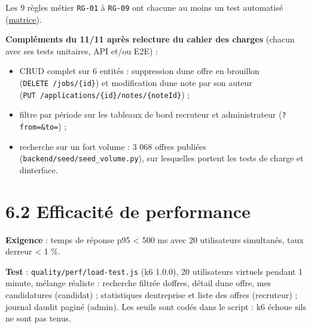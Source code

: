 \documentclass[
  11pt,
]{article}
\providecommand{\tightlist}{%
  \setlength{\itemsep}{0pt}\setlength{\parskip}{0pt}}
\begin{document}
Les 9 règles métier \texttt{RG‑01} à \texttt{RG‑09} ont chacune au moins
un test automatisé (\href{MATRICE_TRACABILITE.pdf}{matrice}).

\textbf{Compléments du 11/11 après relecture du cahier des charges}
(chacun avec ses tests unitaires, API et/ou E2E) :

\begin{itemize}
\tightlist
\item
  CRUD complet sur 6 entités : suppression d\textquotesingle une offre
  en brouillon (\texttt{DELETE\ /jobs/\{id\}}) et modification
  d\textquotesingle une note par son auteur
  (\texttt{PUT\ /}\allowbreak{}\texttt{applications/}\allowbreak{}\texttt{\{id\}/}\allowbreak{}\texttt{notes/}\allowbreak{}\texttt{\{note}\allowbreak{}\texttt{Id\}})
  ;
\item
  filtre par période sur les tableaux de bord recruteur et
  administrateur (\texttt{?from=\&to=}) ;
\item
  recherche sur un fort volume : 3 068 offres publiées
  (\texttt{backend/}\allowbreak{}\texttt{seed/}\allowbreak{}\texttt{seed\_}\allowbreak{}\texttt{volume.}\allowbreak{}\texttt{py}),
  sur lesquelles portent les tests de charge et
  d\textquotesingle interface.
\end{itemize}

\section{6.2 Efficacité de
performance}\label{62-efficacituxe9-de-performance}

\textbf{Exigence} : temps de réponse p95 \textless{} 500 ms avec 20
utilisateurs simultanés, taux d\textquotesingle erreur \textless{} 1 \%.

\textbf{Test} :
\texttt{quality/}\allowbreak{}\texttt{perf/}\allowbreak{}\texttt{load-}\allowbreak{}\texttt{test.}\allowbreak{}\texttt{js}
(k6 1.0.0), 20 utilisateurs virtuels pendant 1 minute, mélange réaliste
: recherche filtrée d\textquotesingle offres, détail
d\textquotesingle une offre, mes candidatures (candidat) ; statistiques
d\textquotesingle entreprise et liste des offres (recruteur) ; journal
d\textquotesingle audit paginé (admin). Les seuils sont codés dans le
script : k6 échoue s\textquotesingle ils ne sont pas tenus.
\end{document}
